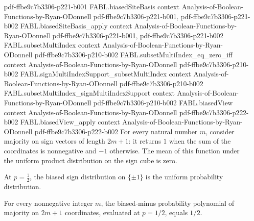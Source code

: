 \begin{theorem}
  {pdf-ffbe9c7b3306-p221-b001}
\proofstep
  {FABL.biasedSiteBasis}
  {context}
  {Analysis-of-Boolean-Functions-by-Ryan-ODonnell}
  {pdf-ffbe9c7b3306-p221-b001,
    pdf-ffbe9c7b3306-p221-b002}
\proofstep
  {FABL.biasedSiteBasis_apply}
  {context}
  {Analysis-of-Boolean-Functions-by-Ryan-ODonnell}
  {pdf-ffbe9c7b3306-p221-b001,
    pdf-ffbe9c7b3306-p221-b002}
\proofstep
  {FABL.subsetMultiIndex}
  {context}
  {Analysis-of-Boolean-Functions-by-Ryan-ODonnell}
  {pdf-ffbe9c7b3306-p210-b002}
\proofstep
  {FABL.subsetMultiIndex_eq_zero_iff}
  {context}
  {Analysis-of-Boolean-Functions-by-Ryan-ODonnell}
  {pdf-ffbe9c7b3306-p210-b002}
\proofstep
  {FABL.signMultiIndexSupport_subsetMultiIndex}
  {context}
  {Analysis-of-Boolean-Functions-by-Ryan-ODonnell}
  {pdf-ffbe9c7b3306-p210-b002}
\proofstep
  {FABL.subsetMultiIndex_signMultiIndexSupport}
  {context}
  {Analysis-of-Boolean-Functions-by-Ryan-ODonnell}
  {pdf-ffbe9c7b3306-p210-b002}
\proofstep
  {FABL.biasedView}
  {context}
  {Analysis-of-Boolean-Functions-by-Ryan-ODonnell}
  {pdf-ffbe9c7b3306-p222-b002}
\proofstep
  {FABL.biasedView_apply}
  {context}
  {Analysis-of-Boolean-Functions-by-Ryan-ODonnell}
  {pdf-ffbe9c7b3306-p222-b002}
For every natural number $m$, consider majority on sign vectors of length $2m+1$: it
returns $1$ when the sum of the coordinates is nonnegative and $-1$ otherwise. The mean
of this function under the uniform product distribution on the sign cube is zero.
\end{theorem}

\begin{theorem}
\label{FABL.biasedSignPMF_one_half_eq_uniform}
\leanok
{}
At $p=\tfrac12$, the biased sign distribution on $\{\pm1\}$ is the uniform probability
distribution.
\end{theorem}

\begin{theorem}
\label{FABL.biasedMinusProbabilityPolynomial_majority_one_half}
\leanok
{}
For every nonnegative integer $m$, the biased-minus probability polynomial of majority
on $2m+1$ coordinates, evaluated at $p=1/2$, equals $1/2$.
\end{theorem}

